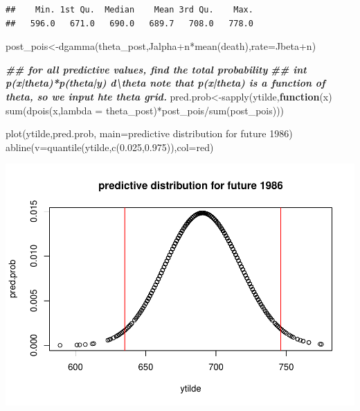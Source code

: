 \documentclass[
]{book}
\newenvironment{Shaded}{\begin{snugshade}}{\end{snugshade}}
\newcommand{\AttributeTok}[1]{\textcolor[rgb]{0.77,0.63,0.00}{#1}}
\newcommand{\ControlFlowTok}[1]{\textcolor[rgb]{0.13,0.29,0.53}{\textbf{#1}}}
\newcommand{\DocumentationTok}[1]{\textcolor[rgb]{0.56,0.35,0.01}{\textbf{\textit{#1}}}}
\newcommand{\FloatTok}[1]{\textcolor[rgb]{0.00,0.00,0.81}{#1}}
\newcommand{\FunctionTok}[1]{\textcolor[rgb]{0.00,0.00,0.00}{#1}}
\newcommand{\NormalTok}[1]{#1}
\newcommand{\OtherTok}[1]{\textcolor[rgb]{0.56,0.35,0.01}{#1}}
\newcommand{\SpecialCharTok}[1]{\textcolor[rgb]{0.00,0.00,0.00}{#1}}
\newcommand{\StringTok}[1]{\textcolor[rgb]{0.31,0.60,0.02}{#1}}
\theoremstyle{definition}
\theoremstyle{definition}
\theoremstyle{definition}
\theoremstyle{definition}
\theoremstyle{remark}
\begin{document}
\begin{verbatim}
##    Min. 1st Qu.  Median    Mean 3rd Qu.    Max. 
##   596.0   671.0   690.0   689.7   708.0   778.0
\end{verbatim}

\begin{Shaded}
\begin{Highlighting}[]
\NormalTok{   post\_pois}\OtherTok{\textless{}{-}}\FunctionTok{dgamma}\NormalTok{(theta\_post,Jalpha}\SpecialCharTok{+}\NormalTok{n}\SpecialCharTok{*}\FunctionTok{mean}\NormalTok{(death),}\AttributeTok{rate=}\NormalTok{Jbeta}\SpecialCharTok{+}\NormalTok{n)}

\DocumentationTok{\#\# for all predictive values,  find the total probability  }
   \DocumentationTok{\#\# int p(x|theta)*p(theta|y) d\textbackslash{}theta  note that p(x|theta) is a function of theta, so we input hte theta grid.}
\NormalTok{ pred.prob}\OtherTok{\textless{}{-}}\FunctionTok{sapply}\NormalTok{(ytilde,}\ControlFlowTok{function}\NormalTok{(x) }\FunctionTok{sum}\NormalTok{(}\FunctionTok{dpois}\NormalTok{(x,}\AttributeTok{lambda =}\NormalTok{ theta\_post)}\SpecialCharTok{*}\NormalTok{post\_pois}\SpecialCharTok{/}\FunctionTok{sum}\NormalTok{(post\_pois)))  }
  
 \FunctionTok{plot}\NormalTok{(ytilde,pred.prob, }\AttributeTok{main=}\StringTok{\textquotesingle{}predictive distribution for future 1986\textquotesingle{}}\NormalTok{)}
 \FunctionTok{abline}\NormalTok{(}\AttributeTok{v=}\FunctionTok{quantile}\NormalTok{(ytilde,}\FunctionTok{c}\NormalTok{(}\FloatTok{0.025}\NormalTok{,}\FloatTok{0.975}\NormalTok{)),}\AttributeTok{col=}\StringTok{\textquotesingle{}red\textquotesingle{}}\NormalTok{)}
\end{Highlighting}
\end{Shaded}

\includegraphics{_main_files/figure-latex/unnamed-chunk-26-2.pdf}
\end{document}
